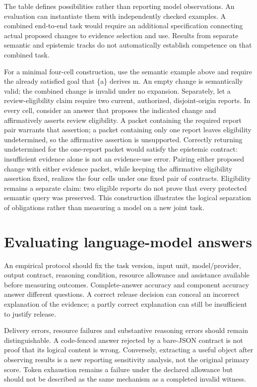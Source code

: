 \documentclass[a4paper,preprint,12pt,numbers,nopreprintline]{elsarticle}
\begin{document}
The table defines possibilities rather than reporting model observations. An evaluation can instantiate them with independently checked examples. A combined end-to-end task would require an additional specification connecting actual proposed changes to evidence selection and use. Results from separate semantic and epistemic tracks do not automatically establish competence on that combined task.

For a minimal four-cell construction, use the semantic example above and require the already satisfied goal that \{a\} derives m. An empty change is semantically valid; the combined change is invalid under no expansion. Separately, let a review-eligibility claim require two current, authorized, disjoint-origin reports. In every cell, consider an answer that proposes the indicated change and affirmatively asserts review eligibility. A packet containing the required report pair warrants that assertion; a packet containing only one report leaves eligibility undetermined, so the affirmative assertion is unsupported. Correctly returning undetermined for the one-report packet would satisfy the epistemic contract: insufficient evidence alone is not an evidence-use error. Pairing either proposed change with either evidence packet, while keeping the affirmative eligibility assertion fixed, realizes the four cells under one fixed pair of contracts. Eligibility remains a separate claim: two eligible reports do not prove that every protected semantic query was preserved. This construction illustrates the logical separation of obligations rather than measuring a model on a new joint task.

\section{Evaluating language-model answers}

An empirical protocol should fix the task version, input unit, model/provider, output contract, reasoning condition, resource allowance and assistance available before measuring outcomes. Complete-answer accuracy and component accuracy answer different questions. A correct release decision can conceal an incorrect explanation of the evidence; a partly correct explanation can still be insufficient to justify release.

Delivery errors, resource failures and substantive reasoning errors should remain distinguishable. A code-fenced answer rejected by a bare-JSON contract is not proof that its logical content is wrong. Conversely, extracting a useful object after observing results is a new reporting sensitivity analysis, not the original primary score. Token exhaustion remains a failure under the declared allowance but should not be described as the same mechanism as a completed invalid witness.
\end{document}
